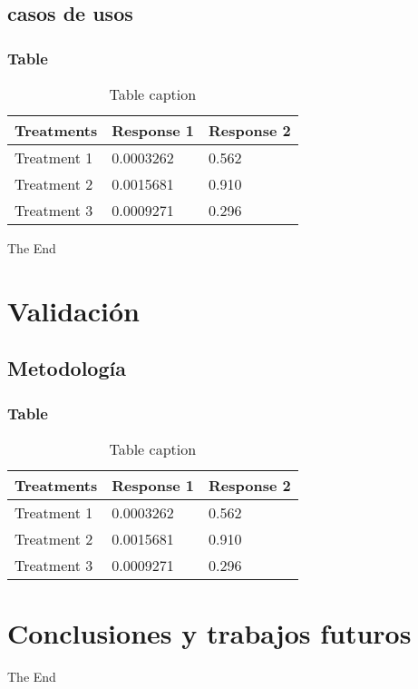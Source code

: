 \documentclass{beamer}
\begin{document}
\subsection{casos de usos} 
\begin{frame}
\frametitle{Table}
\begin{table}
\begin{tabular}{l l l}
\toprule
\textbf{Treatments} & \textbf{Response 1} & \textbf{Response 2}\\
\midrule
Treatment 1 & 0.0003262 & 0.562 \\
Treatment 2 & 0.0015681 & 0.910 \\
Treatment 3 & 0.0009271 & 0.296 \\
\bottomrule
\end{tabular}
\caption{Table caption}
\end{table}
\end{frame}







\begin{frame}
\Huge{\centerline{The End}}
\end{frame}




\section{Validación}
\subsection{Metodología} 
\begin{frame}
\frametitle{Table}
\begin{table}
\begin{tabular}{l l l}
\toprule
\textbf{Treatments} & \textbf{Response 1} & \textbf{Response 2}\\
\midrule
Treatment 1 & 0.0003262 & 0.562 \\
Treatment 2 & 0.0015681 & 0.910 \\
Treatment 3 & 0.0009271 & 0.296 \\
\bottomrule
\end{tabular}
\caption{Table caption}
\end{table}
\end{frame}
\section{Conclusiones y trabajos futuros}




\begin{frame}
\Huge{\centerline{The End}}
\end{frame}

\end{document}
